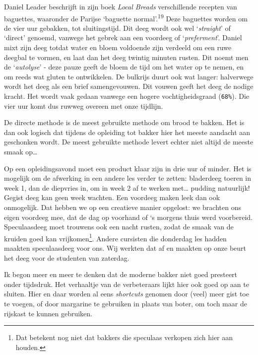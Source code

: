 \documentclass[
  11pt,
  dutch,
]{memoir}
\begin{document}
Daniel Leader beschrijft in zijn boek \emph{Local Breads} verschillende
recepten van baguettes, waaronder de Parijse `baguette
normal'.\textsuperscript{19} Deze baguettes worden om de vier uur
gebakken, tot sluitingstijd. Dit deeg wordt ook wel `\emph{straight}' of
`direct' genoemd, vanwege het gebrek aan een voordeeg of
`\emph{preferment}'. Daniel mixt zijn deeg totdat water en bloem
voldoende zijn verdeeld om een ruwe deegbal te vormen, en laat dan het
deeg twintig minuten rusten. Dit noemt men de `\emph{autolyse}' - deze
pauze geeft de bloem de tijd om het water op te nemen, en om reeds wat
gluten te ontwikkelen. De bulkrijs duurt ook wat langer: halverwege
wordt het deeg als een brief samengevouwen. Dit vouwen geeft het deeg de
nodige kracht. Het wordt vaak gedaan vanwege een hogere
vochtigheidsgraad (\texttt{68\%}). Die vier uur komt dus ruwweg overeen
met onze tijdlijn.

De directe methode is de meest gebruikte methode om brood te bakken. Het
is dan ook logisch dat tijdens de opleiding tot bakker hier het meeste
aandacht aan geschonken wordt. De meest gebruikte methode levert echter
niet altijd de meeste smaak op\ldots{}

Op een opleidingsavond moet een product klaar zijn in drie uur of
minder. Het is mogelijk om de afwerking in een andere les verder te
zetten: bladerdeeg toeren in week 1, dan de diepvries in, om in week 2
af te werken met\ldots{} pudding natuurlijk! Gegist deeg kan geen week
wachten. Een voordeeg maken leek dan ook onmogelijk. Dat hebben we op
een creatieve manier opgelost: we brachten ons eigen voordeeg mee, dat
de dag op voorhand of `s morgens thuis werd voorbereid. Speculaasdeeg
moet trouwens ook een nacht rusten, zodat de smaak van de kruiden goed
kan vrijkomen\footnote{Dat betekent nog niet dat bakkers die speculaas
  verkopen zich hier aan houden.}. Andere cursisten die donderdag les
hadden maakten speculaasdeeg voor ons. Wij werkten dat af en maakten op
onze beurt het deeg voor de studenten van zaterdag.

Ik begon meer en meer te denken dat de moderne bakker niet goed
presteert onder tijdsdruk. Het verhaaltje van de verbeteraars lijkt hier
ook goed op aan te sluiten. Hier en daar worden al eens \emph{shortcuts}
genomen door (veel) meer gist toe te voegen, of door margarine te
gebruiken in plaats van boter, om toch maar de rijskast te kunnen
gebruiken.
\end{document}
